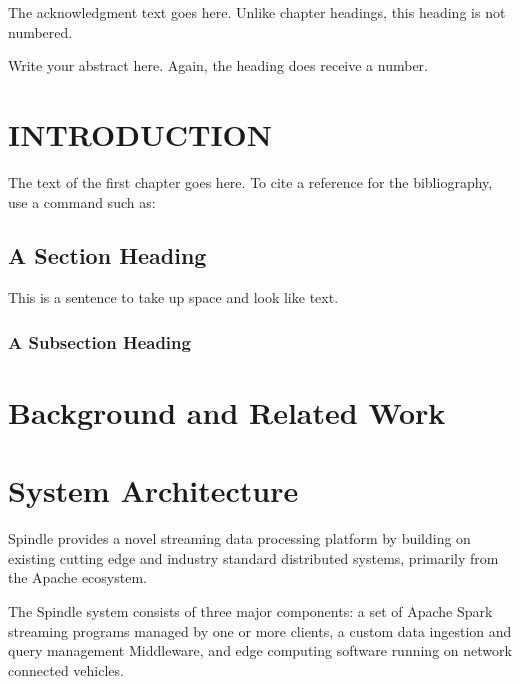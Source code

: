 \documentclass{thesis}
\author{William Rory Kronmiller}
\begin{document}
 
\titlepage             %
\tableofcontents       %
\listoftables          %
\listoffigures         %

The acknowledgment text goes here. Unlike chapter headings, 
this heading is not numbered.

Write your abstract here. Again, the heading does receive a number.

\chapter{INTRODUCTION}
The text of the first chapter goes here. To cite a reference for the
bibliography, use a command such as:\cite{thisbook}
\section{A Section Heading}
This is a sentence to take up space and look like text.
\subsection{A Subsection Heading}

\chapter{Background and Related Work}


%

\chapter{System Architecture}
    Spindle provides a novel streaming data processing platform by building on
    existing cutting edge and industry standard distributed systems, primarily
    from the Apache ecosystem. 

    The Spindle system consists of three major components: a set of Apache Spark %
    streaming programs managed by one or more clients, a custom data ingestion and
    query management Middleware, and edge computing software running on network
    connected vehicles.
    
\end{document}
